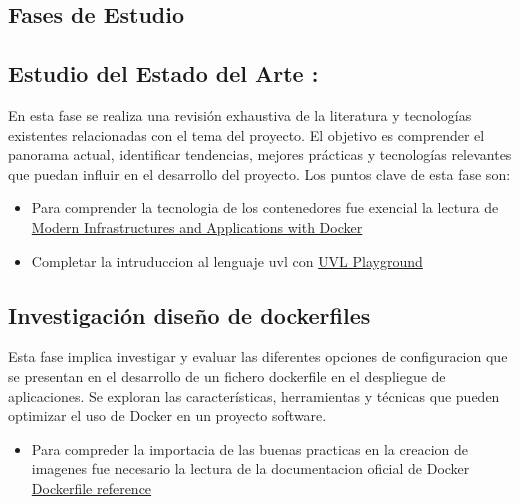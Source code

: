 \documentclass[12pt, a4paper, twoside]{article}
\begin{document}
\subsection{Fases de Estudio}

\subsection{Estudio del Estado del Arte :}
En esta fase se realiza una revisión exhaustiva de la literatura y tecnologías existentes relacionadas con el tema del 
proyecto. El objetivo es comprender el panorama actual, identificar tendencias, mejores prácticas y tecnologías 
relevantes que puedan influir en el desarrollo del proyecto. Los puntos clave de esta fase son:

\begin{itemize}
	\item Para comprender la tecnologia de los contenedores fue exencial la lectura de \href{https://www.oreilly.com/library/view/docker-certified-associate/9781839211898/c5ecd7bc-b7ed-4303-89a8-e487c6a220ed.xhtml#uuid-1a5da664-fb76-4e56-bdb0-83255dde9e78}{Modern Infrastructures and Applications with Docker} \cite{docker_certified_associate}
	\item Completar la intruduccion al lenguaje uvl con \href{https://uvl.uni-ulm.de/}{UVL Playground} \cite{uvl_playground}
\end{itemize}

\subsection{Investigación diseño de dockerfiles}
Esta fase implica investigar y evaluar las diferentes opciones de configuracion que se presentan en el desarrollo de un fichero dockerfile en el 
despliegue de aplicaciones. Se exploran las características, herramientas y técnicas que pueden optimizar el uso de 
Docker en un proyecto software. 

\begin{itemize}
	\item Para compreder la importacia de las buenas practicas en la creacion de imagenes fue necesario la lectura de la documentacion oficial de Docker \href{https://docs.docker.com/reference/dockerfile/}{Dockerfile reference} \cite{dockerfile_reference}
\end{itemize}
\end{document}

